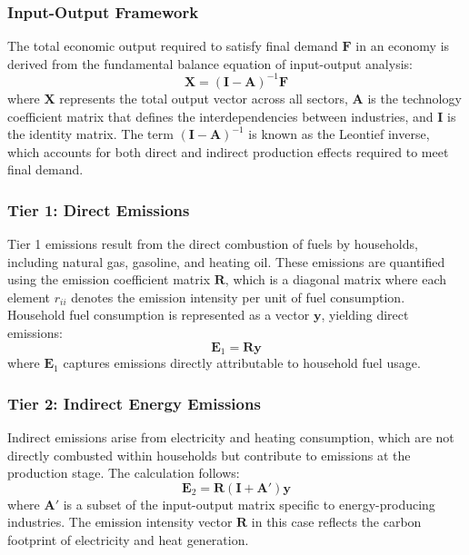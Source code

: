 \documentclass[12pt,a4paper]{article}%
\begin{document}
\subsubsection{Input-Output Framework}
The total economic output required to satisfy final demand \( \mathbf{F} \) in an economy is derived from the fundamental balance equation of input-output analysis:
\begin{equation}
    \mathbf{X} = {(\mathbf{I} - \mathbf{A})}^{-1} \mathbf{F}
\end{equation}
where \( \mathbf{X} \) represents the total output vector across all sectors, \( \mathbf{A} \) is the technology coefficient matrix that defines the interdependencies between industries, and \( \mathbf{I} \) is the identity matrix. The term \( {(\mathbf{I} - \mathbf{A})}^{-1} \) is known as the Leontief inverse, which accounts for both direct and indirect production effects required to meet final demand.

\subsubsection*{Tier 1: Direct Emissions}
Tier 1 emissions result from the direct combustion of fuels by households, including natural gas, gasoline, and heating oil. These emissions are quantified using the emission coefficient matrix \( \mathbf{R} \), which is a diagonal matrix where each element \( r_{ii} \) denotes the emission intensity per unit of fuel consumption. Household fuel consumption is represented as a vector \( \mathbf{y} \), yielding direct emissions:
\begin{equation}
    \mathbf{E}_1 = \mathbf{R} \mathbf{y}
\end{equation}
where \( \mathbf{E}_1 \) captures emissions directly attributable to household fuel usage.

\subsubsection*{Tier 2: Indirect Energy Emissions}
Indirect emissions arise from electricity and heating consumption, which are not directly combusted within households but contribute to emissions at the production stage. The calculation follows:
\begin{equation}
    \mathbf{E}_2 = \mathbf{R} (\mathbf{I} + \mathbf{A}') \mathbf{y}
\end{equation}
where \( \mathbf{A}' \) is a subset of the input-output matrix specific to energy-producing industries. The emission intensity vector \( \mathbf{R} \) in this case reflects the carbon footprint of electricity and heat generation.
\end{document}
